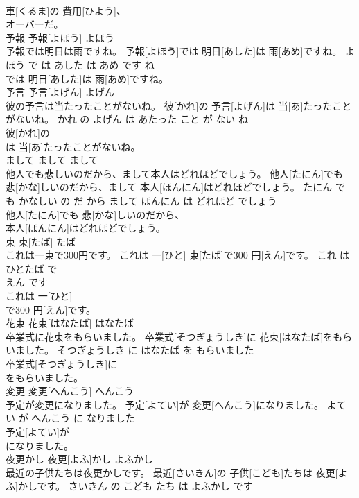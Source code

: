 \documentclass[8pt]{extreport}
\begin{document}
\begin{CJK}{UTF8}{min}
\\	車[くるま]の 費用[ひよう]、
\\	オーバーだ。			
\\	予報	予報[よほう]	よほう	
\\	予報では明日は雨ですね。	予報[よほう]では 明日[あした]は 雨[あめ]ですね。	よほう で は あした は あめ です ね	
\\	では 明日[あした]は 雨[あめ]ですね。			
\\	予言	予言[よげん]	よげん	
\\	彼の予言は当たったことがないね。	彼[かれ]の 予言[よげん]は 当[あ]たったことがないね。	かれ の よげん は あたった こと が ない ね	
\\	彼[かれ]の
\\	は 当[あ]たったことがないね。			
\\	まして	まして	まして	
\\	他人でも悲しいのだから、まして本人はどれほどでしょう。	他人[たにん]でも 悲[かな]しいのだから、まして 本人[ほんにん]はどれほどでしょう。	たにん で も かなしい の だ から まして ほんにん は どれほど でしょう	
\\	他人[たにん]でも 悲[かな]しいのだから、
\\	本人[ほんにん]はどれほどでしょう。			
\\	束	束[たば]	たば	
\\	これは一束で300円です。	これは 一[ひと] 束[たば]で300 円[えん]です。	これ は ひとたば で 
\\	えん です	
\\	これは 一[ひと]
\\	で300 円[えん]です。			
\\	花束	花束[はなたば]	はなたば	
\\	卒業式に花束をもらいました。	卒業式[そつぎょうしき]に 花束[はなたば]をもらいました。	そつぎょうしき に はなたば を もらいました	
\\	卒業式[そつぎょうしき]に
\\	をもらいました。			
\\	変更	変更[へんこう]	へんこう	
\\	予定が変更になりました。	予定[よてい]が 変更[へんこう]になりました。	よてい が へんこう に なりました	
\\	予定[よてい]が
\\	になりました。			
\\	夜更かし	夜更[よふ]かし	よふかし	
\\	最近の子供たちは夜更かしです。	最近[さいきん]の 子供[こども]たちは 夜更[よふ]かしです。	さいきん の こども たち は よふかし です	

\end{CJK}
\end{document}
